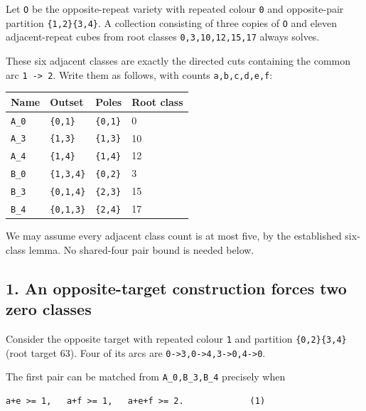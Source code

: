 \documentclass[
  10pt,
]{article}
\begin{document}
Let \texttt{O} be the opposite-repeat variety with repeated colour
\texttt{0} and opposite-pair partition
\texttt{\{1,2\}\textbar{}\{3,4\}}. A collection consisting of three
copies of \texttt{O} and eleven adjacent-repeat cubes from root classes
\texttt{0,3,10,12,15,17} always solves.

These six adjacent classes are exactly the directed cuts containing the
common arc \texttt{1\ -\textgreater{}\ 2}. Write them as follows, with
counts \texttt{a,b,c,d,e,f}:

\begin{longtable}[]{@{}llll@{}}
\toprule\noalign{}
Name & Outset & Poles & Root class \\
\midrule\noalign{}
\endhead
\bottomrule\noalign{}
\endlastfoot
\texttt{A\_0} & \texttt{\{0,1\}} & \texttt{\{0,1\}} & 0 \\
\texttt{A\_3} & \texttt{\{1,3\}} & \texttt{\{1,3\}} & 10 \\
\texttt{A\_4} & \texttt{\{1,4\}} & \texttt{\{1,4\}} & 12 \\
\texttt{B\_0} & \texttt{\{1,3,4\}} & \texttt{\{0,2\}} & 3 \\
\texttt{B\_3} & \texttt{\{0,1,4\}} & \texttt{\{2,3\}} & 15 \\
\texttt{B\_4} & \texttt{\{0,1,3\}} & \texttt{\{2,4\}} & 17 \\
\end{longtable}

We may assume every adjacent class count is at most five, by the
established six-class lemma. No shared-four pair bound is needed below.

\hypertarget{an-opposite-target-construction-forces-two-zero-classes}{%
\subsection*{1. An opposite-target construction forces two zero
classes}\label{an-opposite-target-construction-forces-two-zero-classes}}

Consider the opposite target with repeated colour \texttt{1} and
partition \texttt{\{0,2\}\textbar{}\{3,4\}} (root target 63). Four of
its arcs are
\texttt{0-\textgreater{}3,0-\textgreater{}4,3-\textgreater{}0,4-\textgreater{}0}.

The first pair can be matched from \texttt{A\_0,B\_3,B\_4} precisely
when

\begin{verbatim}
a+e >= 1,   a+f >= 1,   a+e+f >= 2.             (1)
\end{verbatim}
\end{document}
